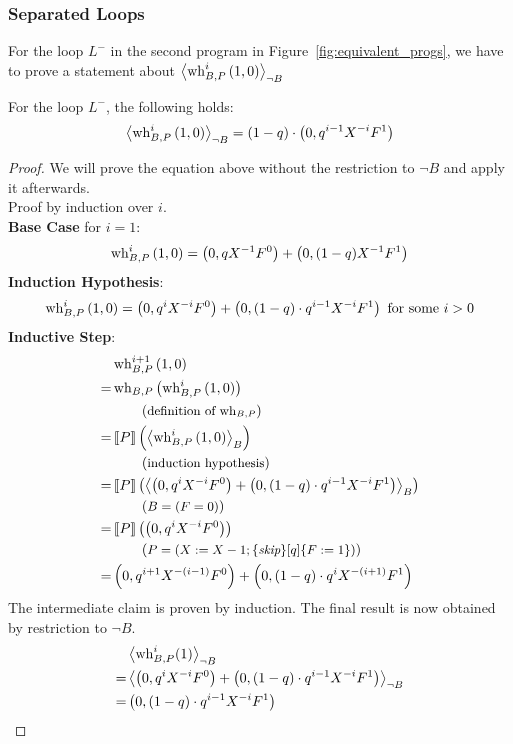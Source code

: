 \subsubsection*{Separated Loops}
For the loop $L^-$ in the second program in Figure~\ref{fig:equivalent_progs}, we have to prove a statement about $\left\langle \operatorname{wh}_{B, P}^i\left( 1, 0 \right) \right\rangle_{\lnot B}$
\begin{lemma}
	For the loop $L^-$, the following holds:
	\[ \left\langle \operatorname{wh}_{B, P}^i\left( 1, 0 \right) \right\rangle_{\lnot B} = (1-q) \cdot \left( 0, q^{i-1} X^{-i} F^1 \right) \]
	\begin{proof}
		We will prove the equation above without the restriction to $\lnot B$ and apply it afterwards. \\
		Proof by induction over $i$. \\
		\textbf{Base Case} for $i = 1$: \\
		\[ \operatorname{wh}_{B, P}^i\left( 1, 0 \right) = \left( 0, q X^{-1} F^0 \right) + \left( 0, (1-q) X^{-1} F^1 \right) \]
		\textbf{Induction Hypothesis}:
		\[ \operatorname{wh}_{B, P}^i\left( 1, 0 \right) = \left( 0, q^i X^{-i} F^0 \right)
			+ \left( 0, (1-q) \cdot q^{i-1} X^{-i} F^1 \right) \text{ for some } i > 0 \]
		\textbf{Inductive Step}:
		\begin{align*}
			 & \operatorname{wh}_{B, P}^{i+1}\left( 1, 0 \right) \\
			=& \operatorname{wh}_{B, P}\left( \operatorname{wh}_{B, P}^i\left( 1, 0 \right) \right) \\
			 & \hspace*{2em} \left(\text{\small definition of $\operatorname{wh}_{B, P}$}\right) \\
			=& \left\llbracket P \right\rrbracket\left( \left\langle  \operatorname{wh}_{B, P}^i\left( 1, 0 \right)  \right\rangle_{B} \right) \\
			 & \hspace*{2em} \left(\text{\small induction hypothesis}\right) \\
			=& \left\llbracket P \right\rrbracket\left( \left\langle  \left( 0, q^i X^{-i} F^0 \right)
				+ \left( 0, (1-q) \cdot q^{i-1} X^{-i} F^1 \right)  \right\rangle_{B} \right) \\
			 & \hspace*{2em} \left(\text{\small $B = (F = 0)$}\right) \\
			=& \left\llbracket P \right\rrbracket\left( \left( 0, q^i X^{-i} F^0 \right) \right) \\
			 & \hspace*{2em} \left(\text{\small $P = \left( X := X - 1; \{ \textit{skip} \}[q]\{ F := 1 \} \right)$}\right) \\
			=& \left( 0, q^{i+1} X^{-(i-1)} F^0 \right)
				+ \left( 0, (1-q) \cdot q^i X^{-(i+1)} F^1 \right)
		\end{align*}
		The intermediate claim is proven by induction.
		The final result is now obtained by restriction to $\lnot B$.
		\begin{align*}
			 & \left\langle \operatorname{wh}_{B, P}^i(1) \right\rangle_{\lnot B} \\
			=& \left\langle  \left( 0, q^i X^{-i} F^0 \right)
				+ \left( 0, (1-q) \cdot q^{i-1} X^{-i} F^1 \right)  \right\rangle_{\lnot B} \\
			=& \left( 0, (1-q) \cdot q^{i-1} X^{-i} F^1 \right)			\qedhere
		\end{align*}
	\end{proof}
\end{lemma}